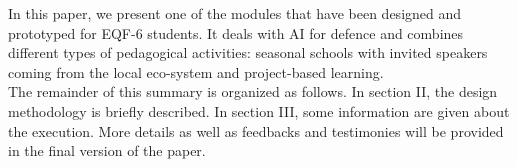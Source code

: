 \documentclass[conference]{IEEEtran}
\begin{document}


\noindent In this paper, we present one of the modules that have been designed and prototyped for EQF-6 students. It deals with AI for defence and combines different types of pedagogical activities: seasonal schools with invited speakers coming from the local eco-system and project-based learning.\\
The remainder of this summary is organized as follows. In section II, the design methodology is briefly described. In section III, some information are given about the execution. More details as well as feedbacks and testimonies will be provided in the final version of the paper.
\end{document}
